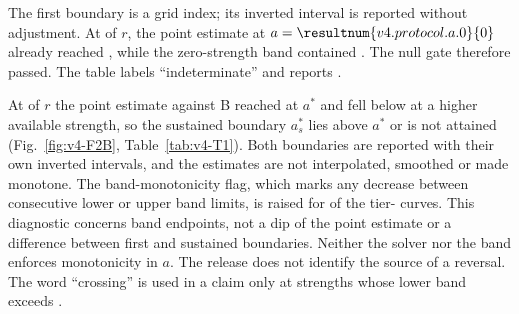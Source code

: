 The first boundary is a grid index; its inverted interval is reported without adjustment. %
At   of $r$, the point estimate at $a=\resultnum{v4.protocol.a.0}{0}$ already reached , while the zero-strength band contained . The null gate therefore passed. The table labels  ``indeterminate'' and reports . %


At   of $r$ the point estimate against B reached  at $a^*$ and fell below  at a higher available strength, so the sustained boundary $a_s^*$ lies above $a^*$ or is not attained (Fig.~\ref{fig:v4-F2B}, Table~\ref{tab:v4-T1}). %
Both boundaries are reported with their own inverted intervals, and the estimates are not interpolated, smoothed or made monotone. %
The band-monotonicity flag, which marks any decrease between consecutive lower or upper band limits, is raised for  of the tier- curves. This diagnostic concerns band endpoints, not a dip of the point estimate or a difference between first and sustained boundaries. %
Neither the solver nor the band enforces monotonicity in $a$. The release does not identify the source of a reversal. %
The word ``crossing'' is used in a claim only at strengths whose lower band exceeds . %


